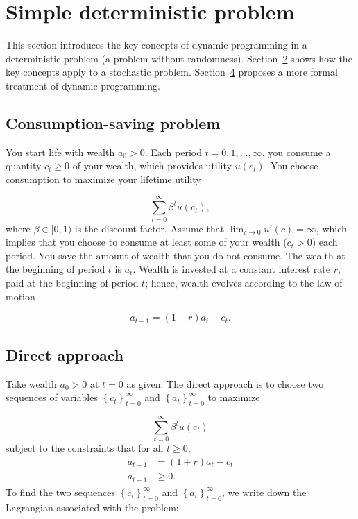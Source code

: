 \documentclass{article}
\begin{document}
\setcounter{section}{0}
\wcTpToc[expand-all,position=end]{}

\section{Simple deterministic problem}\label{sec:deterministic}\wcSpan*[id=ref-sec-deterministic]{}
This section introduces the key concepts of dynamic programming in a deterministic problem (a problem without randomness). Section~\href{stochastic.tex#ref-sec-stochastic}{2} shows how the key concepts apply to a stochastic problem. Section~\href{theory.tex#ref-sec-theory}{4} proposes a more formal treatment of dynamic programming.

\subsection{Consumption-saving problem}\label{subsec:PROBLEM}\wcSpan*[id=ref-subsec-PROBLEM]{}

You start life with wealth $a_0>0$. Each period $t=0,1,\dots,\infty$, you consume a quantity $c_t\ge 0$ of your wealth, which provides utility $u(c_t)$. You choose consumption to maximize your lifetime utility

\[
\sum_{t=0}^{\infty}\beta^t u(c_t),
\]
where $\beta\in[0,1)$ is the discount factor. Assume that $\lim_{c\to 0} u'(c)=\infty$, which implies that you choose to consume at least some of your wealth ($c_{t}>0$) each period. You save the amount of wealth that you do not consume. The wealth at the beginning of period $t$ is $a_t$. Wealth is invested at a constant interest rate $r$, paid at the beginning of period $t$; hence, wealth evolves according to the law of motion

\[
a_{t+1}=(1+r) a_t - c_t.
\]

\subsection{Direct approach}

Take wealth $a_0>0$ at $t=0$ as given. The direct approach is to choose two sequences of variables $\left\lbrace c_t\right\rbrace _{t=0}^{\infty}$ and $\left\lbrace a_t\right\rbrace _{t=0}^{\infty}$ to maximize

\[
\sum_{t=0}^{\infty}\beta^t u(c_t)
\]
subject to the constraints that for all $t\ge 0$,
\wcSpan*[id=equation-1]{}
\setcounter{tpequation}{0}\label{e:constraint1}
\setcounter{tpequation}{1}\label{e:constraint2}
\[
\begin{align*}
a_{t+1}&=(1+r) a_{t}-c_{t}\tag{1}\\
a_{t+1}&\ge 0.\tag{2}
\end{align*}
\]
To find the two sequences $\left\lbrace c_t\right\rbrace _{t=0}^{\infty}$ and $\left\lbrace a_t\right\rbrace _{t=0}^{\infty}$, we write down the Lagrangian associated with the problem:
\end{document}
